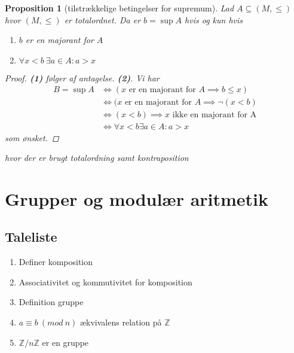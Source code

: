 \documentclass[10pt,twoside,openany,final]{memoir}
\theoremstyle{break}
\newtheorem{proposition}[section]{Proposition}
\theoremstyle{Break}
\newcommand{\Z}{\mathbb{Z}}
\begin{document}
\begin{proposition}[tilstrækkelige betingelser for supremum]
Lad $A \subseteq (M,\leq)$ hvor $(M,\leq)$ er totalordnet. Da er $b=\sup A$ hvis og kun hvis
\begin{enumerate}
\item $b$ er en majorant for $A$
\item $\forall x < b \ \exists a \in A \colon a >x$
\end{enumerate}
\begin{proof}
\textbf{(1)} følger af antagelse. \textbf{(2)}. Vi har
\begin{align*}
B = \sup A &\iff (x \text{ er en majorant for $A \implies b \leq x$})\\
&\iff (x \text{ er en majorant for } A \implies \neg (x < b)\\
&\iff (x < b) \implies x \text{ ikke en majorant for A}\\
&\iff \forall x < b \exists a \in A \colon a >x
\end{align*}
som ønsket.
\end{proof}
hvor der er brugt totalordning samt kontraposition
\end{proposition}

\chapter{Grupper og modulær aritmetik}
\section*{Taleliste}
\begin{enumerate}
\item Definer komposition
\item Associativitet og kommutivitet for komposition
\item Definition gruppe
\item $a \equiv b \ (mod \ n)$ ækvivalens relation på $\Z$
\item $\Z / {n\Z}$ er en gruppe
\end{enumerate}
\end{document}
